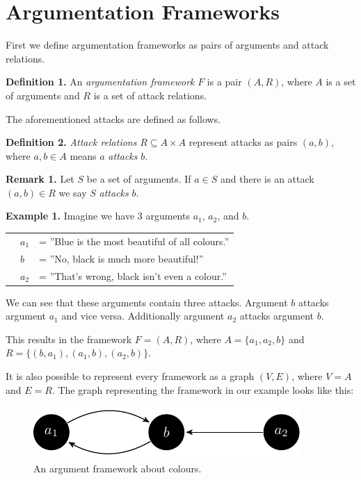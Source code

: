\documentclass[draft,final]{vutinfth} %
\newcommand{\hl}{\par\vspace{6pt}} %
\newcommand{\cl}{\par\vspace{12pt}} %
\begin{document}
\section{Argumentation Frameworks}

First we define argumentation frameworks as pairs of arguments and attack relations.\hl

\textbf{Definition 1.} An \emph{argumentation framework} $F$ is a pair $(A,R)$, where $A$ is a set of arguments and $R$ is a set of attack relations.\cl

The aforementioned attacks are defined as follows.\hl

\textbf{Definition 2.} \emph{Attack relations} $R\subseteq A\times A$ represent attacks as pairs $(a,b)$, where $a,b\in A$ means $a$ \emph{attacks} $b$.\cl

\textbf{Remark 1.} Let $S$ be a set of arguments. If $a\in S$ and there is an attack $(a,b)\in R$ we say $S$ \emph{attacks} $b$.\cl

\textbf{Example 1.} Imagine we have 3 arguments $a_1$, $a_2$, and $b$.\hl
			\begin{tabular}{p{0.5cm}p{0.5cm}l}
			& $a_1$ & = ''Blue is the most beautiful of all colours.''\\
			& $b$ & = ''No, black is much more beautiful!''\\
			& $a_2$ & = ''That's wrong, black isn't even a colour.''
			\end{tabular}\hl
We can see that these arguments contain three attacks. Argument $b$ attacks argument $a_1$ and vice versa. Additionally argument $a_2$ attacks argument $b$.\hl
This results in the framework $F=(A,R)$, where $A=\{a_1,a_2,b\}$ and $R=\{(b,a_1),(a_1,b),(a_2,b)\}$.\cl

It is also possible to represent every framework as a graph $(V,E)$, where $V=A$ and $E=R$. The graph representing the framework in our example looks like this:

\FloatBarrier
	\begin{figure}[!ht]
		\centering
		\includegraphics[width=\linewidth]{graphs/ex1_v2.pdf}
		\caption{An argument framework about colours.}
	\end{figure}
\FloatBarrier
\end{document}
